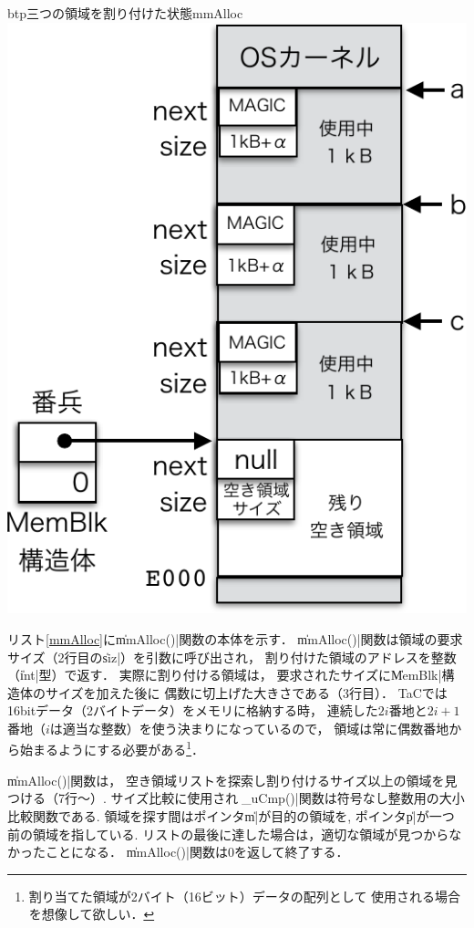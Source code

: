 \begin{myfig}{btp}{三つの領域を割り付けた状態}{mmAlloc}
  \includegraphics[scale=0.66]{Fig/mmAlloc-crop.pdf}
\end{myfig}

リスト\ref{mmAlloc}に\|mmAlloc()|関数の本体を示す．
\|mmAlloc()|関数は領域の要求サイズ（2行目の\|siz|）を引数に呼び出され，
割り付けた領域のアドレスを整数（\|int|型）で返す．
実際に割り付ける領域は，
要求されたサイズに\|MemBlk|構造体のサイズを加えた後に
偶数に切上げた大きさである（3行目）．
TaCでは16bitデータ（2バイトデータ）をメモリに格納する時，
連続した$2i$番地と$2i+1$番地（$i$は適当な整数）を使う決まりになっているので，
領域は常に偶数番地から始まるようにする必要がある\footnote{
  割り当てた領域が2バイト（16ビット）データの配列として
  使用される場合を想像して欲しい．}．



\|mmAlloc()|関数は，
空き領域リストを探索し割り付けるサイズ以上の領域を見つける（7行〜）.
サイズ比較に使用される\|_uCmp()|関数は符号なし整数用の大小比較関数である.
領域を探す間はポインタ\|m|が目的の領域を,
ポインタ\|p|が一つ前の領域を指している.
リストの最後に達した場合は，適切な領域が見つからなかったことになる．
\|mmAlloc()|関数は0を返して終了する．

